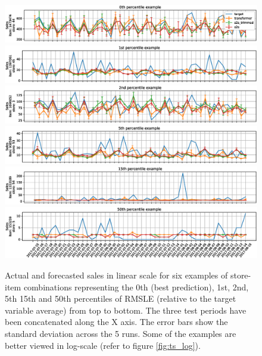 \begin{figure}
\centering
\includegraphics[width=1\linewidth]{salesforecast/images/sample_0_lin}
\includegraphics[width=1\linewidth]{salesforecast/images/sample_1_lin}
\includegraphics[width=1\linewidth]{salesforecast/images/sample_2_lin}
\includegraphics[width=1\linewidth]{salesforecast/images/sample_3_lin}
\includegraphics[width=1\linewidth]{salesforecast/images/sample_4_lin}
\includegraphics[width=1\linewidth]{salesforecast/images/sample_5_lin}
\caption{Actual and forecasted sales in linear scale for six examples of store-item combinations representing the 0th (best prediction), 1st, 2nd, 5th 15th and 50th percentiles of RMSLE (relative to the target variable average) from top to bottom. The three test periods have been concatenated along the X axis. The error bars show the standard deviation across the 5 runs. Some of the examples are better viewed in log-scale (refer to figure \ref{fig:ts_log}).}
\label{fig:ts_lin}
\end{figure}

